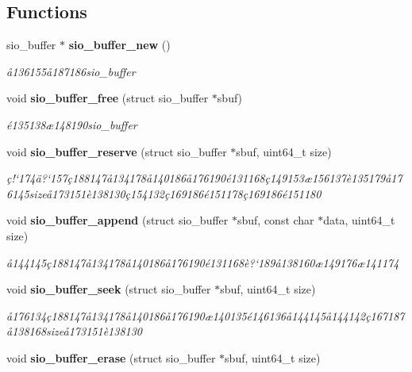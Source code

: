 \subsection*{Functions}
\begin{CompactItemize}
\item 
sio\_\-buffer $\ast$ {\bf sio\_\-buffer\_\-new} ()
\begin{CompactList}\small\item\em \aa{}136155\aa{}187186sio\_\-buffer \item\end{CompactList}\item 
void {\bf sio\_\-buffer\_\-free} (struct sio\_\-buffer $\ast$sbuf)
\begin{CompactList}\small\item\em \'{e}135138\ae{}148190sio\_\-buffer \item\end{CompactList}\item 
void {\bf sio\_\-buffer\_\-reserve} (struct sio\_\-buffer $\ast$sbuf, uint64\_\-t size)
\begin{CompactList}\small\item\em \c{c}!`174\"{a}?`157\c{c}188147\aa{}134178\aa{}140186\aa{}176190\'{e}131168\c{c}149153\ae{}156137\`{e}135179\aa{}176145size\aa{}173151\`{e}138130\c{c}154132\c{c}169186\'{e}151178\c{c}169186\'{e}151180 \item\end{CompactList}\item 
void {\bf sio\_\-buffer\_\-append} (struct sio\_\-buffer $\ast$sbuf, const char $\ast$data, uint64\_\-t size)
\begin{CompactList}\small\item\em \aa{}144145\c{c}188147\aa{}134178\aa{}140186\aa{}176190\'{e}131168\`{e}?`189\aa{}138160\ae{}149176\ae{}141174 \item\end{CompactList}\item 
void {\bf sio\_\-buffer\_\-seek} (struct sio\_\-buffer $\ast$sbuf, uint64\_\-t size)
\begin{CompactList}\small\item\em \aa{}176134\c{c}188147\aa{}134178\aa{}140186\aa{}176190\ae{}140135\'{e}146136\aa{}144145\aa{}144142\c{c}167187\aa{}138168size\aa{}173151\`{e}138130 \item\end{CompactList}\item 
void {\bf sio\_\-buffer\_\-erase} (struct sio\_\-buffer $\ast$sbuf, uint64\_\-t size)

\end{CompactItemize}
